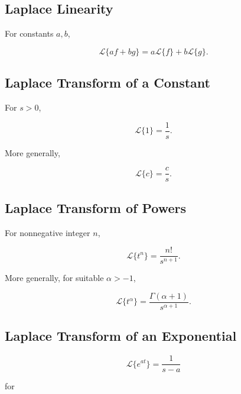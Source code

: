 \subsection{Laplace Linearity}
\label{subsec:laplace-linearity-reference}

For constants \(a,b\),

\[
\boxed{
\mathcal{L}
\{
af+bg
\}
=
a\mathcal{L}\{f\}
+
b\mathcal{L}\{g\}.
}
\]

\subsection{Laplace Transform of a Constant}
\label{subsec:laplace-constant}

For \(s>0\),

\[
\boxed{
\mathcal{L}\{1\}
=
\frac1s.
}
\]

More generally,

\[
\boxed{
\mathcal{L}\{c\}
=
\frac{c}{s}.
}
\]

\subsection{Laplace Transform of Powers}
\label{subsec:laplace-power-reference}

For nonnegative integer \(n\),

\[
\boxed{
\mathcal{L}\{t^n\}
=
\frac{
n!
}{
s^{n+1}
}.
}
\]

More generally, for suitable \(\alpha>-1\),

\[
\boxed{
\mathcal{L}\{t^\alpha\}
=
\frac{
\Gamma(\alpha+1)
}{
s^{\alpha+1}
}.
}
\]

\subsection{Laplace Transform of an Exponential}
\label{subsec:laplace-exponential}

\[
\boxed{
\mathcal{L}\{e^{at}\}
=
\frac{
1
}{
s-a
}
}
\]

for

